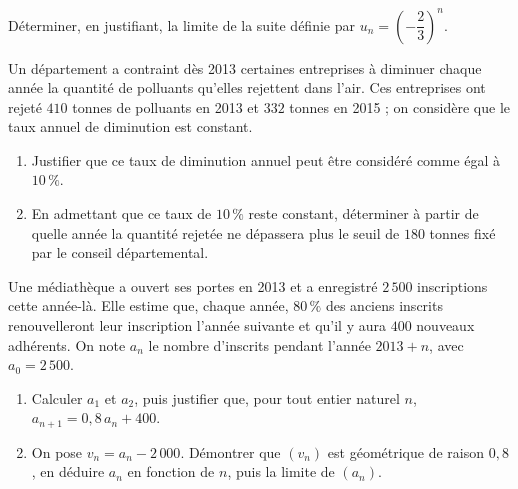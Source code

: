 \begin{annales}
Déterminer, en justifiant, la limite de la suite définie par
$u_{n} = \left(-\dfrac23\right)^{n}$.

Un département a contraint dès 2013 certaines entreprises à diminuer chaque
année la quantité de polluants qu'elles rejettent dans l'air. Ces
entreprises ont rejeté $410$ tonnes de polluants en 2013 et $332$ tonnes en
2015 ; on considère que le taux annuel de diminution est constant.
\begin{enumerate}[label=\textbf{\arabic*.}, leftmargin=*, itemsep=0.2em]
  \item Justifier que ce taux de diminution annuel peut être considéré comme
        égal à $10\,\%$.
  \item En admettant que ce taux de $10\,\%$ reste constant, déterminer à
        partir de quelle année la quantité rejetée ne dépassera plus le seuil
        de $180$ tonnes fixé par le conseil départemental.
\end{enumerate}

Une médiathèque a ouvert ses portes en 2013 et a enregistré $2\,500$
inscriptions cette année-là. Elle estime que, chaque année, $80\,\%$ des
anciens inscrits renouvelleront leur inscription l'année suivante et qu'il y
aura $400$ nouveaux adhérents. On note $a_{n}$ le nombre d'inscrits pendant
l'année $2013+n$, avec $a_{0} = 2\,500$.
\begin{enumerate}[label=\textbf{\arabic*.}, leftmargin=*, itemsep=0.2em]
  \item Calculer $a_{1}$ et $a_{2}$, puis justifier que, pour tout entier
        naturel $n$, $a_{n+1} = 0{,}8\,a_{n}+400$.
  \item On pose $v_{n} = a_{n}-2\,000$. Démontrer que $(v_{n})$ est
        géométrique de raison $0{,}8$, en déduire $a_{n}$ en fonction de $n$,
        puis la limite de $(a_{n})$.
\end{enumerate}
\end{annales}

